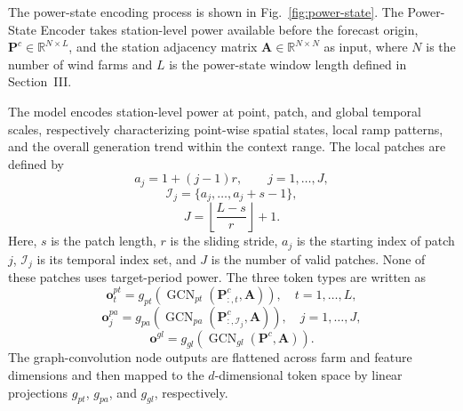 The power-state encoding process is shown in Fig.~\ref{fig:power-state}. The Power-State Encoder takes station-level power available before the forecast origin, \(\mathbf{P}^{c}\in\mathbb{R}^{N\times L}\), and the station adjacency matrix \(\mathbf{A}\in\mathbb{R}^{N\times N}\) as input, where \(N\) is the number of wind farms and \(L\) is the power-state window length defined in Section~III.

The model encodes station-level power at point, patch, and global temporal scales, respectively characterizing point-wise spatial states, local ramp patterns, and the overall generation trend within the context range. The local patches are defined by
\begin{equation}
\label{eq:patch-start}
a_j=1+(j-1)r,\qquad j=1,\ldots,J,
\end{equation}
\begin{equation}
\label{eq:patch-index}
\mathcal{I}_{j}=\{a_j,\ldots,a_j+s-1\},
\end{equation}
\begin{equation}
\label{eq:patch-count}
J=\left\lfloor\frac{L-s}{r}\right\rfloor+1.
\end{equation}
Here, \(s\) is the patch length, \(r\) is the sliding stride, \(a_j\) is the starting index of patch \(j\), \(\mathcal{I}_j\) is its temporal index set, and \(J\) is the number of valid patches. None of these patches uses target-period power. The three token types are written as
\begin{equation}
\label{eq:point-token}
\mathbf{o}^{pt}_{t}=g_{pt}(\operatorname{GCN}_{pt}(\mathbf{P}^{c}_{:,t},\mathbf{A})),
\quad t=1,\ldots,L,
\end{equation}
\begin{equation}
\label{eq:patch-token}
\mathbf{o}^{pa}_{j}
 =g_{pa}(\operatorname{GCN}_{pa}(\mathbf{P}^{c}_{:,\mathcal{I}_{j}},\mathbf{A})),
\quad j=1,\ldots,J,
\end{equation}
\begin{equation}
\label{eq:global-token}
\mathbf{o}^{gl}
 =g_{gl}(\operatorname{GCN}_{gl}(\mathbf{P}^{c},\mathbf{A})).
\end{equation}
The graph-convolution node outputs are flattened across farm and feature dimensions and then mapped to the \(d\)-dimensional token space by linear projections \(g_{pt}\), \(g_{pa}\), and \(g_{gl}\), respectively.

